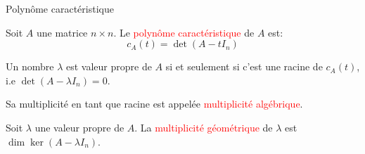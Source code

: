 
\begin{parag}{Polynôme caractéristique}
    \begin{definition}
        
    Soit $A$ une matrice $n \times n$. Le \textcolor{red}{polynôme caractéristique} de $A$ est:
    \[c_A(t) = \det (A-tI_n)\]

    \end{definition}
    \begin{theoreme}
        Un nombre $\lambda$ est valeur propre de $A$ si et seulement si c'est une racine de $c_A(t)$, i.e $\det (A - \lambda I_n) = 0$.
    \end{theoreme}
    Sa multiplicité en tant que racine est appelée \textcolor{red}{multiplicité algébrique}.
    \begin{definition}
        Soit $\lambda$ une valeur propre de $A$. La \textcolor{red}{multiplicité géométrique} de $\lambda$ est $\dim \ker (A- \lambda I_n)$.
    \end{definition}

\end{parag}



